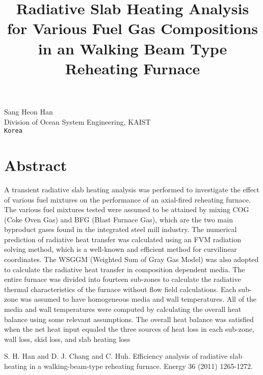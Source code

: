 \title{Radiative Slab Heating Analysis for Various Fuel Gas Compositions in an Walking Beam Type Reheating Furnace}
 \author{} \institute{}
\maketitle
\begin{center}
{\large Sang Heon Han}\\
Division of Ocean System Engineering, KAIST\\
{\tt Korea}

\end{center}

\section*{Abstract}

A transient radiative slab heating analysis was performed to investigate the effect of various fuel mixtures on the performance of an axial-fired reheating furnace. The various fuel mixtures tested were assumed to be attained by mixing COG (Coke Oven Gas) and BFG (Blast Furnace Gas), which are the two main byproduct gases found in the integrated steel mill industry. The numerical prediction of radiative heat transfer was calculated using an FVM radiation solving method, which is a well-known and efficient method for curvilinear coordinates. The WSGGM  (Weighted Sum of Gray Gas Model) was also adopted to calculate the radiative heat transfer in composition dependent media. The entire furnace was divided into fourteen sub-zones to calculate the radiative thermal characteristics of the furnace without flow field calculations. Each sub-zone was assumed to have homogeneous media and wall temperatures. All of the media and wall temperatures were computed by calculating the overall heat balance using some relevant assumptions. The overall heat balance was satisfied when the net heat input equaled the three sources of heat loss in each sub-zone, wall loss, skid loss, and slab heating loss


\begin{thebibliography}{10}

{\sc S. H. Han and D. J. Chang and C. Huh}. {Efficiency analysis of radiative slab heating in a walking-beam-type reheating furnace}. Energy 36 (2011) 1265-1272.

\end{thebibliography}
